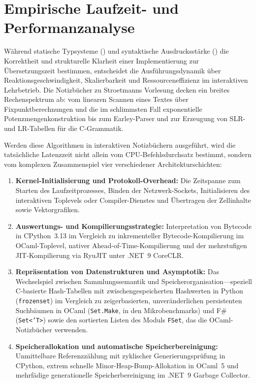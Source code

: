 \chapter{Empirische Laufzeit- und Performanzanalyse}
\label{chap:performance}

Während statische Typsysteme () und syntaktische Ausdrucksstärke () die Korrektheit und strukturelle Klarheit einer Implementierung zur Übersetzungszeit bestimmen, entscheidet die Ausführungsdynamik über Reaktionsgeschwindigkeit, Skalierbarkeit und Ressourceneffizienz im interaktiven Lehrbetrieb.
Die Notizbücher zu Stroetmanns Vorlesung decken ein breites Rechenspektrum ab: vom linearen Scannen eines Textes über Fixpunktberechnungen und die im schlimmsten Fall exponentielle Potenzmengenkonstruktion bis zum Earley-Parser und zur Erzeugung von SLR- und LR-Tabellen für die C-Grammatik.

Werden diese Algorithmen in interaktiven Notizbüchern ausgeführt, wird die tatsächliche Latenzzeit nicht allein vom CPU-Befehlsdurchsatz bestimmt, sondern vom komplexen Zusammenspiel vier verschiedener Architekturschichten:
\begin{enumerate}
  \item \textbf{Kernel-Initialisierung und Protokoll-Overhead:} Die Zeitspanne zum Starten des Laufzeitprozesses, Binden der Netzwerk-Sockets, Initialisieren des interaktiven Toplevels oder Compiler-Dienstes und Übertragen der Zellinhalte sowie Vektorgrafiken.
  \item \textbf{Auswertungs- und Kompilierungsstrategie:} Interpretation von Bytecode in CPython~3.13 im Vergleich zu inkrementeller Bytecode-Kompilierung im OCaml-Toplevel, nativer Ahead-of-Time-Kompilierung und der mehrstufigen JIT-Kompilierung via RyuJIT unter .NET~9 CoreCLR.
  \item \textbf{Repräsentation von Datenstrukturen und Asymptotik:} Das Wechselspiel zwischen Sammlungssemantik und Speicherorganisation---speziell C-basierte Hash-Tabellen mit zwischengespeicherten Hashwerten in Python (\texttt{frozenset}) im Vergleich zu zeigerbasierten, unveränderlichen persistenten Suchbäumen in OCaml (\texttt{Set.Make}, in den Mikrobenchmarks) und F\# (\texttt{Set<'T>}) sowie den sortierten Listen des Moduls \texttt{FSet}, das die OCaml-Notizbücher verwenden.
  \item \textbf{Speicherallokation und automatische Speicherbereinigung:} Unmittelbare Referenzzählung mit zyklischer Generierungsprüfung in CPython, extrem schnelle Minor-Heap-Bump-Allokation in OCaml~5 und mehrfädige generationelle Speicherbereinigung im .NET~9 Garbage Collector.
\end{enumerate}

